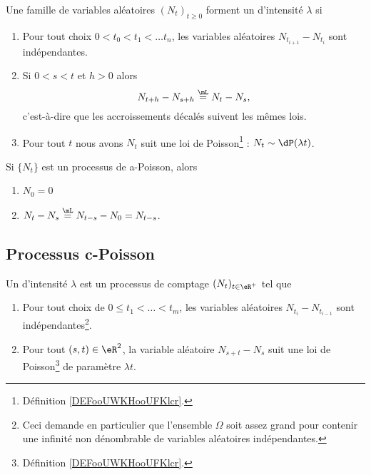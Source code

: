 \begin{definition}
	Une famille de variables aléatoires \( (N_t)_{t\geq 0}\) forment un  d'intensité \( \lambda\) si
	\begin{enumerate}
		\item Pour tout choix \( 0<t_0<t_1<\ldots t_n\), les variables aléatoires \( N_{t_{i+1}}-N_{t_i}\) sont indépendantes.
		\item Si \( 0<s<t\) et \( h>0\) alors
		      \begin{equation}
			      N_{t+h}-N_{s+h}\stackrel{\mL}{=}N_t-N_s,
		      \end{equation}
		      c'est-à-dire que les accroissements décalés suivent les mêmes lois.
		\item Pour tout \( t\) nous avons \( N_t\) suit une loi de Poisson\footnote{Définition \ref{DEFooUWKHooUFKlcr}.} : \( N_t\sim\dP(\lambda t)\).
	\end{enumerate}
\end{definition}

\begin{lemma}	\label{LEMooSOUNooJDMQpM}
	Si \( \{ N_t \}\) est un processus de a-Poisson, alors
	\begin{enumerate}
		\item
		      \( N_0=0\)
		\item
		      \( N_t-N_s\stackrel{\mL}{=}N_{t-s}-N_0=N_{t-s}\).
	\end{enumerate}
\end{lemma}

\subsection{Processus c-Poisson}

\begin{definition}        \label{DEFooWDXDooRGCtXL}
	Un  d'intensité \( \lambda\) est un processus de comptage \( (N_t)_{t\in \eR^+}\) tel que
	\begin{enumerate}
		\item
		      Pour tout choix de \( 0\leq t_1<\ldots < t_m\), les variables aléatoires \( N_{t_i}-N_{t_{i-1}}\) sont indépendantes\footnote{Ceci demande en particulier que l'ensemble \( \Omega\) soit assez grand pour contenir une infinité non dénombrable de variables aléatoires indépendantes.}.
		\item
		      Pour tout \( (s,t)\in \eR^2\), la variable aléatoire \( N_{s+t}-N_s\) suit une loi de Poisson\footnote{Définition \ref{DEFooUWKHooUFKlcr}.} de paramètre \( \lambda t\).
	\end{enumerate}
\end{definition}


